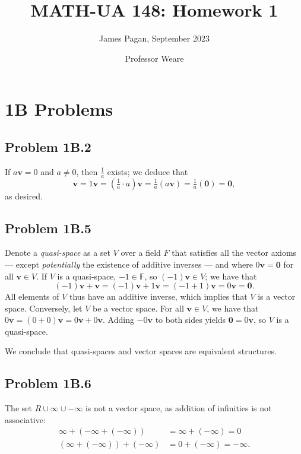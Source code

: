 \documentclass[11pt]{article}
\title{MATH-UA 148: Homework 1}
\author{James Pagan, September 2023}
\date{Professor Weare}
\renewcommand{\vec}[1]{\mathbf{#1}}
\begin{document}
\maketitle
\tableofcontents

\newpage


\section{1B Problems}

\subsection{Problem 1B.2}

If $a \vec{v} = 0$ and $a \ne 0$, then $\tfrac{1}{a}$ exists; we deduce that
\[
	\vec{v} = 1 \vec{v} = \left( \tfrac{1}{a} \cdot a \right) \vec{v} = \tfrac{1}{a} (a \vec{v}) = \tfrac{1}{a} (\vec{0}) = \vec{0}, 
\]
as desired.

\subsection{Problem 1B.5}

Denote a \textit{quasi-space} as a set $V$ over a field $F$ that satisfies all the vector axioms --- except \textit{potentially} the existence of additive inverses --- and where $0 \vec{v} = \vec{0}$ for all $\vec{v} \in V$. If $V$ is a quasi-space, $-1 \in \mathbb{F}$, so $(-1)\vec{v} \in V$; we have that
\[
	(-1)\vec{v} +\vec{v} = (-1) \vec{v} + 1 \vec{v} = (-1 + 1) \vec{v} = 0 \vec{v} = \vec{0}.
\]
All elements of $V$ thus have an additive inverse, which implies that $V$ is a vector space. Conversely, let $V$ be a vector space. For all $\vec{v} \in V$, we have that $0 \vec{v} = (0 + 0) \vec{v} = 0 \vec{v} + 0 \vec{v}$. Adding $-0 \vec{v}$ to both sides yields $\vec{0} = 0 \vec{v}$, so $V$ is a quasi-space.

We conclude that quasi-spaces and vector spaces are equivalent structures.

\subsection{Problem 1B.6}

The set $R \cup \infty \cup - \infty$ is not a vector space, as addition of infinities is not associative:
\begin{align*}
	\infty + (- \infty + (- \infty)) &= \infty + (- \infty) = 0 \\ (\infty + (- \infty)) + (- \infty) &= 0 + (- \infty) = - \infty.
\end{align*}
\end{document}
